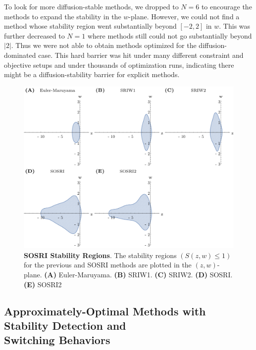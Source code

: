 \documentclass{article}
\begin{document}
To look for more diffusion-stable methods, we dropped to $N=6$ to
encourage the methods to expand the stability in the $w$-plane. However,
we could not find a method whose stability region went substantially
beyond $\left[-2,2\right]$ in $w$. This was further decreased to
$N=1$ where methods still could not go substantially beyond $\left|2\right|$.
Thus we were not able to obtain methods optimized for the diffusion-dominated
case. This hard barrier was hit under many different constraint and
objective setups and under thousands of optimization runs, indicating
there might be a diffusion-stability barrier for explicit methods.
\begin{center}
	\begin{figure}
		\begin{centering}
			\includegraphics[scale=0.46]{paper_figures/DiagonalStability}
			\par\end{centering}
		\caption{\textbf{SOSRI Stability Regions}. The stability regions $\left(S(z,w)\leq1\right)$for
			the previous and SOSRI methods are plotted in the $(z,w)$-plane.
			\textbf{(A) }Euler-Maruyama. \textbf{(B) }SRIW1. \textbf{(C) }SRIW2.
			\textbf{(D) }SOSRI. \textbf{(E) }SOSRI2\label{fig:SOSRI-Stability-Regions.}}
	\end{figure}
	\par\end{center}

\subsection{Approximately-Optimal Methods with Stability Detection and \\
	Switching Behaviors\label{subsec:StabilityDetection}}
\end{document}
